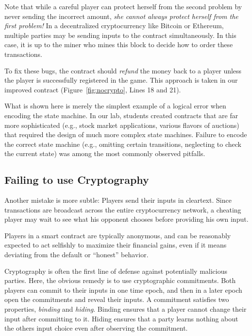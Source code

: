 \documentclass{llncs}
\newcommand{\elaine}[1]{}
\begin{document}
Note that while a careful player 
can protect herself from the second problem by never sending the incorrect amount,
{\it she cannot always protect 
herself from the first problem!}
In a decentralized cryptocurrency
like Bitcoin or Ethereum, 
multiple parties may be sending inputs 
to the contract simultaneously.
In this case, it is up to the miner who mines this block
to decide how to order these transactions.

To fix these bugs, the contract
should \emph{refund} the money back to
a player unless the player is successfully registered in the game.
This approach is taken in our improved contract (Figure~\ref{fig:nocrypto}, Lines 18 and 21).


What is shown here is merely the simplest example 
of a logical error when encoding the state machine.
In our lab, students created contracts that are far more
sophisticated (e.g., stock market 
applications, various flavors of auctions)
that required the design of much more 
complex state machines.
Failure to encode the correct state machine (e.g., 
omitting certain transitions, neglecting
to check the current state)  
was among the most commonly observed pitfalls. 


\subsection{Failing to use Cryptography}
Another mistake is more subtle:
Players
send their inputs in cleartext. Since transactions are broadcast across the entire cryptocurrency network, a cheating player may wait to see what his opponent chooses before providing his own input.

Players in a smart contract are typically anonymous, and can be reasonably expected to act selfishly to maximize their financial gains, even if it means deviating from the default or ``honest'' behavior.

Cryptography is often the first line of defense against potentially malicious parties. 
Here, the obvious remedy is to use
cryptographic commitments.
Both players can commit to their inputs in one time epoch,
and then in a later epoch open the commitments and reveal their inputs.
A commitment satisfies two properties, {\it binding} and {\it hiding}.
Binding ensures that a player cannot change their input
after committing to it. Hiding ensures
that a party learns nothing about the others input choice even after observing the commitment.
\end{document}
